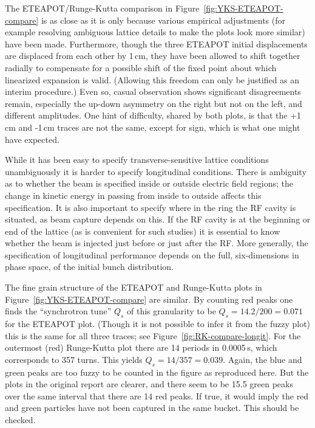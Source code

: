 \documentclass[12]{article}
\begin{document}
The ETEAPOT/Runge-Kutta comparison in Figure~\ref{fig:YKS-ETEAPOT-compare}
is as close as it is only because various empirical adjustments
(for example resolving ambiguous lattice details to make the plots look
more similar) have been made.
Furthermore, though the three ETEAPOT initial displacements are displaced from
each other by 1\,cm, they have been allowed to shift together radially to compensate
for a possible shift of the fixed point about which linearized expansion
is valid. (Allowing this freedom can only be justified as an interim procedure.) 
Even so, casual observation shows significant disagreements 
remain, especially the up-down asymmetry on the right but not on the left,
and different amplitudes. One hint of difficulty, shared by both plots, 
is that the +1\,cm and -1\,cm traces are not the same, except for sign,
which is what one might have expected. 

While it has been easy to specify transverse-sensitive lattice
conditions unambiguously it is harder to specify longitudinal
conditions. There is ambiguity as to whether the beam is specified 
inside or outside electric field regions; the change in kinetic
energy in passing from inside to outside affects this specification.
It is also important to specify where in the ring the RF cavity is
situated, as beam capture depends on this. If the RF cavity is
at the beginning or end of the lattice (as is convenient for such studies) 
it is essential to know whether the beam is injected just before or
just after the RF. More generally, the specification of longitudinal
performance depends on the full, six-dimensions in phase space,
of the initial bunch distribution.

The fine grain structure of the ETEAPOT and Runge-Kutta plots in
Figure~\ref{fig:YKS-ETEAPOT-compare} are similar. By counting red peaks one
finds the ``synchrotron tune'' $Q_s$ of this granularity to be 
$Q_s=14.2/200=0.071$ for the ETEAPOT plot. (Though it is not possible to infer 
it from the fuzzy plot) this is the same for all three traces; 
see Figure~\ref{fig:RK-compare-longit}. For the outermost
(red) Runge-Kutta plot there are 14 periods in 0.0005\,s, which corresponds to
357 turns. This yields $Q_s=14/357=0.039$. Again, the blue and green peaks
are too fuzzy to be counted in the figure as reproduced here. But the
plots in the original report\cite{YKS-tracking} are clearer, and there
seem to be 15.5 green peaks over the same interval that there are 14
red peaks. If true, it would imply the red and green particles have not
been captured in the same bucket. This should be checked. 
\end{document}
